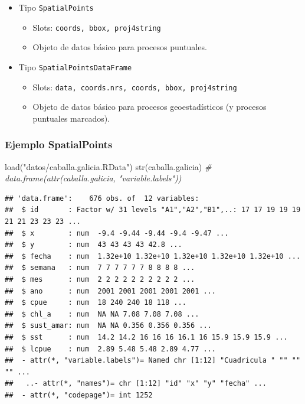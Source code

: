 \documentclass[
  spanish,
]{book}
\newenvironment{Shaded}{\begin{snugshade}}{\end{snugshade}}
\newcommand{\CommentTok}[1]{\textcolor[rgb]{0.56,0.35,0.01}{\textit{#1}}}
\newcommand{\FunctionTok}[1]{\textcolor[rgb]{0.00,0.00,0.00}{#1}}
\newcommand{\NormalTok}[1]{#1}
\newcommand{\StringTok}[1]{\textcolor[rgb]{0.31,0.60,0.02}{#1}}
\theoremstyle{break}
\begin{document}
\begin{itemize}
\item
  Tipo \texttt{SpatialPoints}

  \begin{itemize}
  \item
    Slots: \texttt{coords,\ bbox,\ proj4string}
  \item
    Objeto de datos básico para procesos puntuales.
  \end{itemize}
\item
  Tipo \texttt{SpatialPointsDataFrame}

  \begin{itemize}
  \item
    Slots: \texttt{data,\ coords.nrs,\ coords,\ bbox,\ proj4string}
  \item
    Objeto de datos básico para procesos geoestadísticos (y procesos
    puntuales marcados).
  \end{itemize}
\end{itemize}

\hypertarget{ejemplo-spatialpoints}{%
\subsubsection{Ejemplo SpatialPoints}\label{ejemplo-spatialpoints}}

\begin{Shaded}
\begin{Highlighting}[]
\FunctionTok{load}\NormalTok{(}\StringTok{"datos/caballa.galicia.RData"}\NormalTok{)}
\FunctionTok{str}\NormalTok{(caballa.galicia)  }\CommentTok{\# data.frame(attr(caballa.galicia, "variable.labels"))}
\end{Highlighting}
\end{Shaded}

\begin{verbatim}
## 'data.frame':    676 obs. of  12 variables:
##  $ id       : Factor w/ 31 levels "A1","A2","B1",..: 17 17 19 19 19 21 21 23 23 23 ...
##  $ x        : num  -9.4 -9.44 -9.44 -9.4 -9.47 ...
##  $ y        : num  43 43 43 43 42.8 ...
##  $ fecha    : num  1.32e+10 1.32e+10 1.32e+10 1.32e+10 1.32e+10 ...
##  $ semana   : num  7 7 7 7 7 7 8 8 8 8 ...
##  $ mes      : num  2 2 2 2 2 2 2 2 2 2 ...
##  $ ano      : num  2001 2001 2001 2001 2001 ...
##  $ cpue     : num  18 240 240 18 118 ...
##  $ chl_a    : num  NA NA 7.08 7.08 7.08 ...
##  $ sust_amar: num  NA NA 0.356 0.356 0.356 ...
##  $ sst      : num  14.2 14.2 16 16 16 16.1 16 15.9 15.9 15.9 ...
##  $ lcpue    : num  2.89 5.48 5.48 2.89 4.77 ...
##  - attr(*, "variable.labels")= Named chr [1:12] "Cuadricula " "" "" "" ...
##   ..- attr(*, "names")= chr [1:12] "id" "x" "y" "fecha" ...
##  - attr(*, "codepage")= int 1252
\end{verbatim}
\end{document}
